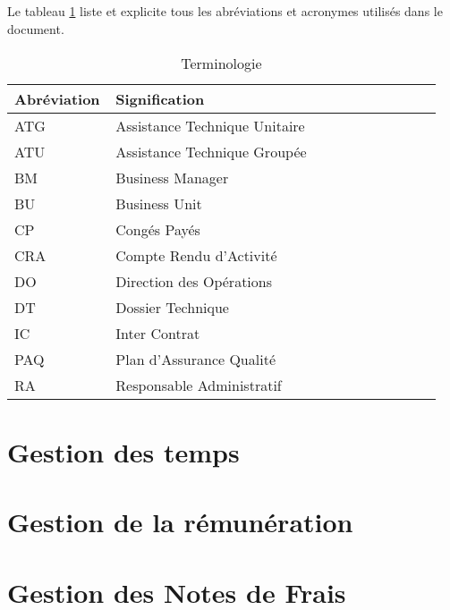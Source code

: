 \documentclass[12pt]{scrreprt}
\begin{document}
\paragraph{} Le tableau \ref{abbr} liste et explicite tous les abréviations et acronymes utilisés dans le document.
\begin{table}[H]
\begin{center}
    \begin{longtable}{|p{0.2\linewidth}|p{0.75\linewidth}|}
    \hline  %
    \rowcolor[gray]{.8}
    Abréviation & Signification\\
    \hline
    ATG & Assistance Technique Unitaire\\
    \hline
    ATU & Assistance Technique Groupée\\
    \hline
    BM & Business Manager\\
    \hline
    BU & Business Unit \\
    \hline
    CP & Congés Payés\\
    \hline
    CRA & Compte Rendu d'Activité\\
    \hline
    DO & Direction des Opérations\\
    \hline
    DT & Dossier Technique\\
    \hline
    IC & Inter Contrat\\
    \hline
    PAQ & Plan d'Assurance Qualité\\
    \hline
    RA& Responsable Administratif\\
    \hline
    \end{longtable}
    \caption{Terminologie}
    \label{abbr}
\end{center}
\end{table}




\chapter{Gestion des temps}



\chapter{Gestion de la rémunération}

\chapter{Gestion des Notes de Frais}

\end{document}
